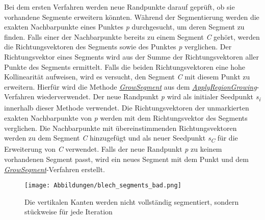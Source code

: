 Bei dem ersten Verfahren werden neue Randpunkte darauf geprüft, ob sie vorhandene Segmente erweitern könnten. Während der Segmentierung werden die exakten Nachbarpunkte eines Punktes \textit{p} durchgesucht, um deren Segment zu finden. Falls einer der Nachbarpunkte bereits zu einem Segment \textit{C} gehört, werden die Richtungsvektoren des Segments sowie des Punktes \textit{p} verglichen. Der Richtungsvektor eines Segments wird aus der Summe der Richtungsvektoren aller Punkte des Segments ermittelt. Falls die beiden Richtungsvektoren eine hohe Kollinearität aufweisen, wird es versucht, den Segment \textit{C} mit diesem Punkt zu erweitern. Hierfür wird die Methode \textit{\hyperref[alg:grow_segment]{GrowSegment}} aus dem \textit{\hyperref[alg:apply_region_growing]{ApplyRegionGrowing}}-Verfahren wiederverwendet. Der neue Randpunkt \textit{p} wird als initialer Seedpunkt \textit{s\textsubscript{i}} innerhalb dieser Methode verwendet. Die Richtungsvektoren der unmarkierten exakten Nachbarpunkte von \textit{p} werden mit dem Richtungsvektor des Segments verglichen. Die Nachbarpunkte mit übereinstimmenden Richtungsvektoren werden zu dem Segment \textit{C} hinzugefügt und als neuer Seedpunkt \textit{s\textsubscript{C}} für die Erweiterung von \textit{C} verwendet. Falls der neue Randpunkt \textit{p} zu keinem vorhandenen Segment passt, wird ein neues Segment mit dem Punkt und dem \textit{\hyperref[alg:grow_segment]{GrowSegment}}-Verfahren erstellt.

\begin{figure}[b!]
	\texttt{[image: Abbildungen/blech\_segments\_bad.png]}
	\centering
	\caption[Falsch segmentierte Kanten]{Die vertikalen Kanten werden nicht vollständig segmentiert, sondern stückweise für jede Iteration}
	\label{fig: bad_segments}
\end{figure}

